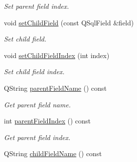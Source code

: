 \begin{DoxyCompactItemize}
\begin{DoxyCompactList}\small\item\em Set parent field index. \end{DoxyCompactList}\item 
\hypertarget{classmdt_sql_relation_item_a9a2ad2ee2590c1dea371e6b64c026a73}{
void \hyperlink{classmdt_sql_relation_item_a9a2ad2ee2590c1dea371e6b64c026a73}{setChildField} (const QSqlField \&field)}
\label{classmdt_sql_relation_item_a9a2ad2ee2590c1dea371e6b64c026a73}

\begin{DoxyCompactList}\small\item\em Set child field. \end{DoxyCompactList}\item 
\hypertarget{classmdt_sql_relation_item_a870cfae68f4913225e0ae48554c3163f}{
void \hyperlink{classmdt_sql_relation_item_a870cfae68f4913225e0ae48554c3163f}{setChildFieldIndex} (int index)}
\label{classmdt_sql_relation_item_a870cfae68f4913225e0ae48554c3163f}

\begin{DoxyCompactList}\small\item\em Set child field index. \end{DoxyCompactList}\item 
\hypertarget{classmdt_sql_relation_item_aa660ce6575b4ce9ad9d551d0b284e528}{
QString \hyperlink{classmdt_sql_relation_item_aa660ce6575b4ce9ad9d551d0b284e528}{parentFieldName} () const }
\label{classmdt_sql_relation_item_aa660ce6575b4ce9ad9d551d0b284e528}

\begin{DoxyCompactList}\small\item\em Get parent field name. \end{DoxyCompactList}\item 
\hypertarget{classmdt_sql_relation_item_a18d078e5e784de2d0e14cbb6238155f9}{
int \hyperlink{classmdt_sql_relation_item_a18d078e5e784de2d0e14cbb6238155f9}{parentFieldIndex} () const }
\label{classmdt_sql_relation_item_a18d078e5e784de2d0e14cbb6238155f9}

\begin{DoxyCompactList}\small\item\em Get parent field index. \end{DoxyCompactList}\item 
\hypertarget{classmdt_sql_relation_item_a8cd667086a4ace612b009b0eb7494a1c}{
QString \hyperlink{classmdt_sql_relation_item_a8cd667086a4ace612b009b0eb7494a1c}{childFieldName} () const }
\label{classmdt_sql_relation_item_a8cd667086a4ace612b009b0eb7494a1c}


\end{DoxyCompactItemize}
